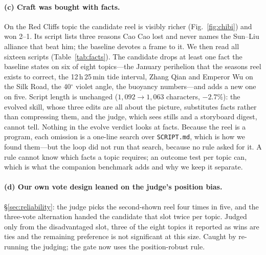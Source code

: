 \documentclass[11pt]{article}
\begin{document}
\paragraph{(c) Craft was bought with facts.} On the Red Cliffs topic the candidate reel is visibly
richer (Fig.~\ref{fig:chibi}) and won 2--1. Its script lists three reasons Cao Cao lost and never
names the Sun--Liu alliance that beat him; the baseline devotes a frame to it. We then read all
sixteen scripts (Table~\ref{tab:facts}). The candidate drops at least one fact the baseline states on
six of eight topics---the January perihelion that the seasons reel exists to correct, the 12\,h\,25\,min
tide interval, Zhang Qian and Emperor Wu on the Silk Road, the 40$^\circ$ violet angle, the buoyancy
numbers---and adds a new one on five. Script length is unchanged ($1{,}092 \rightarrow 1{,}063$
characters, $-2.7\%$): the evolved skill, whose three edits are all about the picture, substitutes
facts rather than compressing them, and the judge, which sees stills and a storyboard digest, cannot
tell. Nothing in the evolve verdict looks at facts. Because the reel is a program, each omission is a
one-line search over \texttt{SCRIPT.md}, which is how we found them---but the loop did not run that
search, because no rule asked for it. A rule cannot know which facts a topic requires; an outcome test
per topic can, which is what the companion benchmark adds and why we keep it separate.

\paragraph{(d) Our own vote design leaned on the judge's position bias.} \S\ref{sec:reliability}: the
judge picks the second-shown reel four times in five, and the three-vote alternation handed the
candidate that slot twice per topic. Judged only from the disadvantaged slot, three of the eight topics it reported as wins are ties and
the remaining preference is not significant at this size. Caught by re-running the judging; the gate
now uses the position-robust rule.
\end{document}
